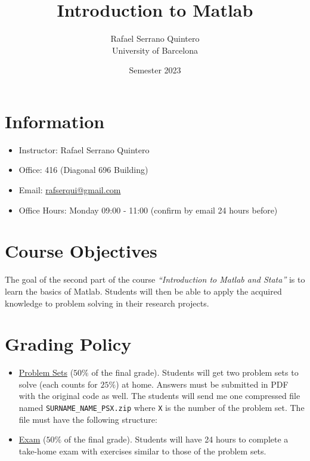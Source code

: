 \documentclass[a4paper,12pt]{article}
\begin{document}

\title{\textbf{Introduction to Matlab}}
\author{Rafael Serrano Quintero \\
University of Barcelona}
\date{ Semester 2023}

\maketitle

\section{Information}

\begin{itemize}
    \item Instructor: Rafael Serrano Quintero
    \item Office: 416 (Diagonal 696 Building)
    \item Email: \href{mailto:rafserqui@gmail.com}{rafserqui@gmail.com}
    \item Office Hours: Monday 09:00 - 11:00 (confirm by email 24 hours before)
\end{itemize}

\section{Course Objectives}

The goal of the second part of the course \textit{``Introduction to Matlab and Stata''} is to learn the basics of Matlab. Students will then be able to apply the acquired knowledge to problem solving in their research projects.

\section{Grading Policy}

\begin{itemize}
    \item \underline{Problem Sets} ($50\%$ of the final grade).
    Students will get two problem sets to solve (each counts for $25\%$) at home. Answers must be submitted in PDF with the original code as well. The students will send me one compressed file named \verb+SURNAME_NAME_PSX.zip+ where \verb+X+ is the number of the problem set. The file must have the following structure:
    
    \begin{minipage}[c]{0.8\textwidth}
    \end{minipage}
    \item \underline{Exam} ($50\%$ of the final grade). Students will have 24 hours to complete a take-home exam with exercises similar to those of the problem sets.
\end{itemize}
\end{document}

